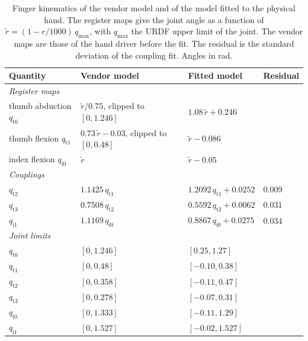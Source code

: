 \begin{table}[!htbp]%
    \centering%
    \caption{Finger kinematics of the vendor model and of the model fitted to the physical hand. The register maps give the joint angle as a function of $\tilde{r}=(1-r/1000)\,q_{\max}$, with $q_{\max}$ the URDF upper limit of the joint. The vendor maps are those of the hand driver before the fit. The residual is the standard deviation of the coupling fit. Angles in rad.}%
    \label{tab:hand-fit-params}%
    \small
    \begin{tabular}{llll}
        \toprule
        Quantity & Vendor model & Fitted model & Residual \\
        \midrule
        \multicolumn{4}{l}{\emph{Register maps}} \\
        thumb abduction $q_{\mathrm{t}0}$ & $\tilde{r}/0.75$, clipped to $[0,1.246]$ & $1.08\,\tilde{r}+0.246$ & \\
        thumb flexion $q_{\mathrm{t}1}$ & $0.73\,\tilde{r}-0.03$, clipped to $[0,0.48]$ & $\tilde{r}-0.086$ & \\
        index flexion $q_{\mathrm{i}0}$ & $\tilde{r}$ & $\tilde{r}-0.05$ & \\
        \midrule
        \multicolumn{4}{l}{\emph{Couplings}} \\
        $q_{\mathrm{t}2}$ & $1.1425\,q_{\mathrm{t}1}$ & $1.2092\,q_{\mathrm{t}1}+0.0252$ & 0.009 \\
        $q_{\mathrm{t}3}$ & $0.7508\,q_{\mathrm{t}2}$ & $0.5592\,q_{\mathrm{t}2}+0.0062$ & 0.031 \\
        $q_{\mathrm{i}1}$ & $1.1169\,q_{\mathrm{i}0}$ & $0.8867\,q_{\mathrm{i}0}+0.0275$ & 0.034 \\
        \midrule
        \multicolumn{4}{l}{\emph{Joint limits}} \\
        $q_{\mathrm{t}0}$ & $[0, 1.246]$ & $[0.25, 1.27]$ & \\
        $q_{\mathrm{t}1}$ & $[0, 0.48]$ & $[-0.10, 0.38]$ & \\
        $q_{\mathrm{t}2}$ & $[0, 0.358]$ & $[-0.11, 0.47]$ & \\
        $q_{\mathrm{t}3}$ & $[0, 0.278]$ & $[-0.07, 0.31]$ & \\
        $q_{\mathrm{i}0}$ & $[0, 1.333]$ & $[-0.11, 1.29]$ & \\
        $q_{\mathrm{i}1}$ & $[0, 1.527]$ & $[-0.02, 1.527]$ & \\
        \bottomrule
    \end{tabular}
\end{table}%

